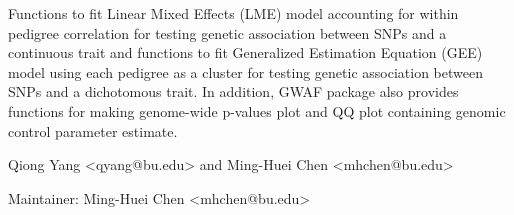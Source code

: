 \begin{Description}\relax
Functions to fit Linear Mixed Effects (LME) model accounting for within pedigree correlation 
for testing genetic association between SNPs and a continuous trait and functions to 
fit Generalized Estimation Equation (GEE) model using each pedigree as a cluster for 
testing genetic association between SNPs and a dichotomous trait. In addition, GWAF package 
also provides functions for making genome-wide p-values plot and QQ plot containing genomic control 
parameter estimate.
\end{Description}
\begin{Details}\relax
{}
\end{Details}
\begin{Author}\relax
Qiong Yang <qyang@bu.edu> and Ming-Huei Chen <mhchen@bu.edu>

Maintainer: Ming-Huei Chen <mhchen@bu.edu>
\end{Author}

